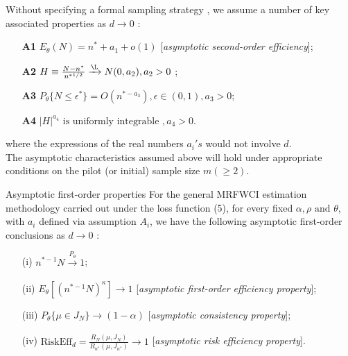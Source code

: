 \documentclass [xcolor=svgnames, t] {beamer}
\begin{document}
\begin{frame}{}
\vspace{15mm}
 Without specifying a formal sampling strategy , we assume a number of key associated properties as $d \xrightarrow{} 0$ :
   
    \begin{itemize}
        \item[\textbf{A1}] $ E_{\theta}(N)=n^* +a_1 +o(1)$ [\textit{asymptotic second-order efficiency}];
         \item[\textbf{A2}] $H \equiv \frac{N-n^*}{n^{*1/2}} \xrightarrow{\L} N(0,a_2), a_2>0$ ;
          \item[\textbf{A3}] $P_{\theta}\{ N \le \epsilon^*\}=O(n^{*-a_3}),\epsilon \in (0,1), a_3>0$;
           \item[\textbf{A4}] $|H|^{a_4} \text{ is uniformly integrable },a_4 >0$.
    \end{itemize}
    
    where the expressions of the real numbers $a_i's$ would not involve $d$.\\
    \vspace{0.2cm}
    The asymptotic characteristics assumed above will hold under appropriate conditions on the pilot (or initial) sample size $m( \geq 2)$.
\end{frame}
\begin{frame}{Asymptotic first-order properties}
\vspace{7mm}
For the general MRFWCI estimation methodology carried out under the loss function (5), for every fixed $\alpha, \rho \text{ and } \theta$, with $a_i$ defined via assumption $A_i$, we have the following asymptotic first-order conclusions as $d \xrightarrow{} 0$ :

\begin{itemize}
\item[(i)] $n^{*-1}N \xrightarrow[]{P_{\theta}}1$;
\item[(ii)] $E_{\theta}[(n^{*-1}N)^{\kappa}] \xrightarrow[]{} 1$ [\textit{asymptotic first-order efficiency property}];
\item[(iii)] $P_{\theta} \{ \mu \in J_N\} \xrightarrow[]{} (1-\alpha)$ [\textit{asymptotic consistency property}];
\item[(iv)] $\text{RiskEff}_d =\frac{R_N(\mu,J_N)}{R_{n^*}(\mu,J_{n^*})} \xrightarrow[]{} 1$ [\textit{asymptotic risk efficiency property}].
\end{itemize}
 
\end{frame}
\end{document}
